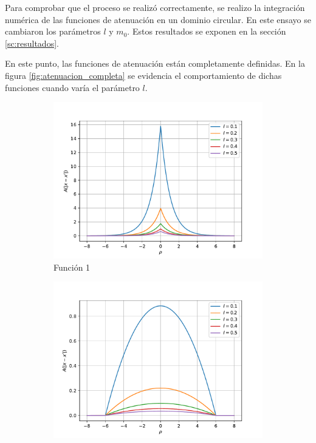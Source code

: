Para comprobar que el proceso se realizó correctamente, se realizo la integración numérica de las funciones de atenuación en un dominio circular. En este ensayo se cambiaron los parámetros $l$ y $m_0$. Estos resultados se exponen en la sección \ref{sc:resultados}.

En este punto, las funciones de atenuación están completamente definidas. En la figura \ref{fig:atenuacion_completa} se evidencia el comportamiento de dichas funciones cuando varía el parámetro $l$.

\begin{figure}
    \centering
    \sffamily
    \begin{subfigure}{0.48\textwidth}
    \centering
        \includegraphics[width=\textwidth]{figuras/biexp2dl.pdf}
        \caption{Función 1}
        \label{fig:atenuacion_completa.f1}
    \end{subfigure}
    \begin{subfigure}{0.48\textwidth}
    \centering
        \includegraphics[width=\textwidth]{figuras/campana2dl.pdf}

\end{subfigure}
\end{figure}
